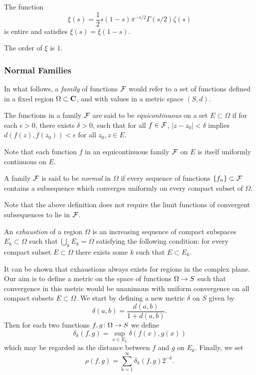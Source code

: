\begin{corollary}
  The function
  \[
  \xi(s) = \frac{1}{2} s (1-s) \pi^{-s/2} \Gamma(s/2) \zeta(s)
  \]
  is entire and satisfies $\xi(s) = \xi(1-s)$.
\end{corollary}

\begin{proposition}
  The order of $\xi$ is $1$.
\end{proposition}

\subsubsection{Normal Families}

In what follows, a \emph{family} of functions $\mathcal{F}$ would refer to a set of functions defined in a fixed region $\Omega \subset \mathbf{C}$, and with values in a metric space $(S,d)$.

\begin{definition}
  The functions in a family $\mathcal{F}$ are said to be \emph{equicontinuous} on a set $E \subset \Omega$ if for each $\epsilon > 0$, there exists $\delta > 0$, such that for all $f \in \mathcal{F}$, $|z-z_0| < \delta$ implies $d(f(z),f(z_0)) < \epsilon$ for all $z_0,z \in E$.
\end{definition}

Note that each function $f$ in an equicontinuous family $\mathcal{F}$ on $E$ is itself uniformly continuous on $E$.

\begin{definition}
  A family $\mathcal{F}$ is said to be \emph{normal} in $\Omega$ if every sequence of functions $\{f_n\} \subset \mathcal{F}$ contains a subsequence which converges uniformly on every compact subset of $\Omega$.
\end{definition}

Note that the above definition does not require the limit functions of convergent subsequences to lie in $\mathcal{F}$.

\begin{definition}
  An \emph{exhaustion} of a region $\Omega$ is an increasing sequence of compact subspaces $E_k \subset \Omega$ such that $\bigcup_k E_k = \Omega$ satisfying the following condition: for every compact subset $E \subset \Omega$ there exists some $k$ such that $E \subset E_k$.
\end{definition}

It can be shown that exhaustions always exists for regions in the complex plane. Our aim is to define a metric on the space of functions $\Omega \rightarrow S$ such that convergence in this metric would be unanimous with uniform convergence on all compact subsets $E \subset \Omega$. We start by defining a new metric $\delta$ on $S$ given by
\[
\delta(a,b) = \frac{d(a,b)}{1+d(a,b)}.
\]
Then for each two functions $f, g \colon \Omega \rightarrow S$ we define
\[
\delta_k(f,g) = \sup_{x \in E_k} \delta(f(x),g(x))
\]
which may be regarded as the distance between $f$ and $g$ on $E_k$. Finally, we set
\[
\rho(f,g) = \sum_{k=1}^\infty \delta_k(f,g) 2^{-k}.
\]

